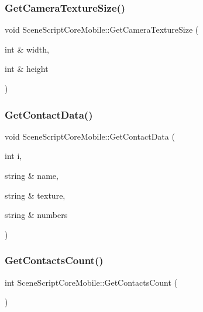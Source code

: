 \hypertarget{class_scene_script_core_mobile_a7e4ce77ca8cf3d103a27209e7f92bc88}{}\label{class_scene_script_core_mobile_a7e4ce77ca8cf3d103a27209e7f92bc88} 
\subsubsection{\texorpdfstring{Get\+Camera\+Texture\+Size()}{GetCameraTextureSize()}}
{\footnotesize\ttfamily void Scene\+Script\+Core\+Mobile\+::\+Get\+Camera\+Texture\+Size (\begin{DoxyParamCaption}\item[{int \&}]{width,  }\item[{int \&}]{height }\end{DoxyParamCaption})}

\hypertarget{class_scene_script_core_mobile_ab91eabbfa351de0cbfa0f5262641d9e4}{}\label{class_scene_script_core_mobile_ab91eabbfa351de0cbfa0f5262641d9e4} 
\subsubsection{\texorpdfstring{Get\+Contact\+Data()}{GetContactData()}}
{\footnotesize\ttfamily void Scene\+Script\+Core\+Mobile\+::\+Get\+Contact\+Data (\begin{DoxyParamCaption}\item[{int}]{i,  }\item[{string \&}]{name,  }\item[{string \&}]{texture,  }\item[{string \&}]{numbers }\end{DoxyParamCaption})}

\hypertarget{class_scene_script_core_mobile_a92a5d4e0afdb25d6aa3dc6ae95ca034a}{}\label{class_scene_script_core_mobile_a92a5d4e0afdb25d6aa3dc6ae95ca034a} 
\subsubsection{\texorpdfstring{Get\+Contacts\+Count()}{GetContactsCount()}}
{\footnotesize\ttfamily int Scene\+Script\+Core\+Mobile\+::\+Get\+Contacts\+Count (\begin{DoxyParamCaption}{ }\end{DoxyParamCaption})}

